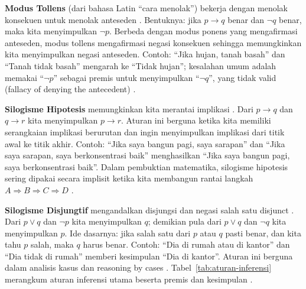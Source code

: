 \textbf{Modus Tollens} (dari bahasa Latin ``cara menolak'') bekerja dengan menolak konsekuen untuk menolak anteseden \cite{rosen2019,copi2014}. Bentuknya: jika $p \rightarrow q$ benar dan $\neg q$ benar, maka kita menyimpulkan $\neg p$. Berbeda dengan modus ponens yang mengafirmasi anteseden, modus tollens mengafirmasi negasi konsekuen sehingga memungkinkan kita menyimpulkan negasi anteseden. Contoh: ``Jika hujan, tanah basah'' dan ``Tanah tidak basah'' mengarah ke ``Tidak hujan''; kesalahan umum adalah memakai ``$\neg p$'' sebagai premis untuk menyimpulkan ``$\neg q$'', yang tidak valid (fallacy of denying the antecedent) \cite{levin_discrete,rosen2019}.

\textbf{Silogisme Hipotesis} memungkinkan kita merantai implikasi \cite{rosen2019,levin_discrete}. Dari $p \rightarrow q$ dan $q \rightarrow r$ kita menyimpulkan $p \rightarrow r$. Aturan ini berguna ketika kita memiliki serangkaian implikasi berurutan dan ingin menyimpulkan implikasi dari titik awal ke titik akhir. Contoh: ``Jika saya bangun pagi, saya sarapan'' dan ``Jika saya sarapan, saya berkonsentrasi baik'' menghasilkan ``Jika saya bangun pagi, saya berkonsentrasi baik''. Dalam pembuktian matematika, silogisme hipotesis sering dipakai secara implisit ketika kita membangun rantai langkah $A \Rightarrow B \Rightarrow C \Rightarrow D$ \cite{forallx,copi2014}.

\textbf{Silogisme Disjungtif} mengandalkan disjungsi dan negasi salah satu disjunct \cite{rosen2019}. Dari $p \vee q$ dan $\neg p$ kita menyimpulkan $q$; demikian pula dari $p \vee q$ dan $\neg q$ kita menyimpulkan $p$. Ide dasarnya: jika salah satu dari $p$ atau $q$ pasti benar, dan kita tahu $p$ salah, maka $q$ harus benar. Contoh: ``Dia di rumah atau di kantor'' dan ``Dia tidak di rumah'' memberi kesimpulan ``Dia di kantor''. Aturan ini berguna dalam analisis kasus dan reasoning by cases \cite{levin_discrete,cmu_natded}. Tabel~\ref{tab:aturan-inferensi} merangkum aturan inferensi utama beserta premis dan kesimpulan \cite{rosen2019,levin_discrete,brilliant_rules_inference,wiki_rules_of_inference}.

